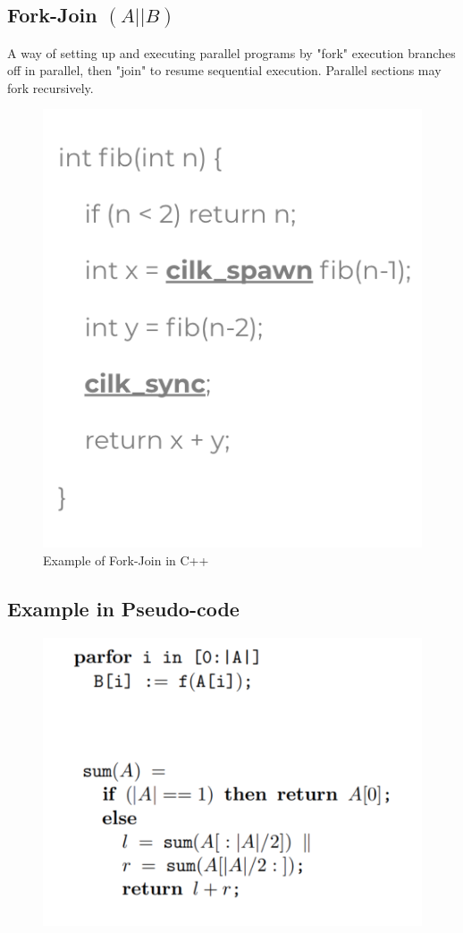 \documentclass[12pt]{article}
\begin{document}
\subsection{Fork-Join $(A \lvert\rvert B)$}
A way of setting up and executing parallel programs by "fork" execution branches off in parallel, then "join" to resume sequential execution. Parallel sections may fork recursively.
\begin{figure}
  \centering
  \includegraphics[scale=0.8]{cpp-forkjoin.png}
   \caption{Example of Fork-Join in C++}
\end{figure}

\subsection{Example in Pseudo-code}
\begin{figure}[H]
  \centering
  \includegraphics[scale=0.5]{pseudo-example.png}
\end{figure}
\end{document}
